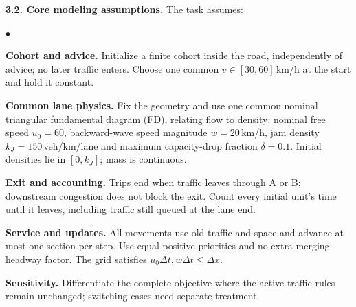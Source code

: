 \documentclass[10pt,a4paper]{article}
\newcommand{\Own}[1]{\textcolor{Own}{#1}}
\newenvironment{points}{\begin{list}{$\bullet$}{%
 \setlength{\leftmargin}{1.3em}\setlength{\labelwidth}{0.6em}%
 \setlength{\labelsep}{0.4em}\setlength{\itemsep}{2pt}%
 \setlength{\parsep}{0pt}\setlength{\topsep}{2pt}}}{\end{list}}
\begin{document}
\begin{samepage}
\textbf{3.2. Core modeling assumptions.}
\Own{The task assumes}:
\begin{points}
\item \textbf{Cohort and advice.} Initialize a finite cohort inside the road,
independently of advice; no later traffic enters. Choose one common
$v\in[30,60]$\,km/h at the start and hold it constant.
\item \textbf{Common lane physics.} Fix the geometry and use one common
nominal triangular fundamental diagram (FD), relating flow to density:
nominal free speed $u_0=60$, backward-wave speed magnitude $w=20$\,km/h,
jam density $k_J=150$\,veh/km/lane and maximum capacity-drop fraction
$\delta=0.1$. Initial densities lie in $[0,k_J]$; mass is continuous.
\item \textbf{Exit and accounting.} Trips end when traffic leaves through A
or B; downstream congestion does not block the exit. Count every initial
unit's time until it leaves, including traffic still queued at the lane end.
\item \textbf{Service and updates.} All movements use old traffic and space
and advance at most one section per step. Use equal positive priorities
and no extra merging-headway factor. The grid satisfies
$u_0\Delta t,w\Delta t\leq\Delta x$.
\item \textbf{Sensitivity.} Differentiate the complete objective where the
active traffic rules remain unchanged; switching cases need separate treatment.
\end{points}
\end{samepage}
\end{document}

